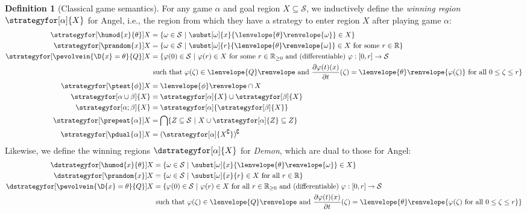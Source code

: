 \documentclass[12pt]{cmuthesis}
\theoremstyle{definition}
\newtheorem{definition}{Definition}
\theoremstyle{remark}
\newcommand{\ivr}{Q}
\newcommand{\allstate}{\mathcal{S}}
\newcommand{\om}{\omega}
\newcommand{\tint}[2]{\lenvelope{#1}\renvelope{#2}}
\newcommand{\fint}[1]{\lenvelope{#1}\renvelope}
\begin{document}
\begin{definition}[Classical game semantics]\label{def:dgl-sem-game}
For any game $\alpha$ and goal region $X \subseteq \allstate$, we inductively define the \emph{winning region} $\strategyfor[\alpha]{X}$ for Angel, i.e., the region from which they have a strategy to enter region $X$ after playing game $\alpha$:
\begin{align*}
\strategyfor[\humod{x}{\theta}]{X} &= \{ \om \in \allstate~|~\subst[\om]{x}{\tint{\theta}{\om}} \in X\} \\
\strategyfor[\prandom{x}]{X}       &= \{ \om \in \allstate~|~\subst[\om]{r}{\tint{\theta}{\om}} \in X\text{ for some }r \in \mathbb{R}\} \\
\strategyfor[\pevolvein{\D{x}=\theta}{\ivr}]{X} &= \{\varphi(0) \in \allstate~|~\varphi(r) \in X\text{ for some }r \in \mathbb{R}_{\geq0}\text{ and (differentiable) }\varphi:[0,r]\to \allstate\\
&\text{ such that }\varphi(\zeta) \in \fint{\ivr}\text{ and } \frac{\partial \varphi(t)(x)}{\partial t}(\zeta) = \tint{\theta}{\varphi(\zeta)}\text{ for all }0 \leq \zeta \leq r \}\\
\strategyfor[\ptest{\phi}]{X}      &= \fint{\phi} \cap X \\
\strategyfor[\alpha \cup \beta]{X} &= \strategyfor[\alpha]{X} \cup \strategyfor[\beta]{X}\\
\strategyfor[\alpha;\beta]{X}      &= \strategyfor[\alpha]{\strategyfor[\beta]{X}}\\
\strategyfor[\prepeat{\alpha}]{X}  &= \bigcap\{Z \subseteq \allstate~|~ X \cup \strategyfor[\alpha]{Z} \subseteq Z\}\\
\strategyfor[\pdual{\alpha}]{X}    &= (\strategyfor[\alpha]{X^\complement})^\complement
\end{align*}
Likewise, we define the winning regions $\dstrategyfor[\alpha]{X}$ for \emph{Demon}, which are dual to those for Angel:
\begin{align*}
\dstrategyfor[\humod{x}{\theta}]{X} &= \{ \om \in \allstate~|~\subst[\om]{x}{\tint{\theta}{\om}} \in X\}\\
\dstrategyfor[\prandom{x}]{X}       &= \{ \om \in \allstate~|~\subst[\om]{x}{r} \in X\text{ for all }r \in \mathbb{R}\} \\
\dstrategyfor[\pevolvein{\D{x}=\theta}{\ivr}]{X} &= \{\varphi(0) \in \allstate~|~\varphi(r) \in X\text{ for all }r \in \mathbb{R}_{\geq0}\text{ and (differentiable) }\varphi:[0,r]\to\allstate\\
&\text{ such that }\varphi(\zeta) \in \fint{\ivr}\text{ and }\frac{\partial\varphi(t)(x)}{\partial t}(\zeta) = \tint{\theta}{\varphi(\zeta)\text{ for all }0 \leq \zeta \leq r}\}\\

\end{align*}
\end{definition}
\end{document}
